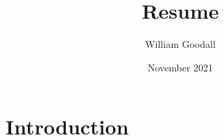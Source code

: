 \documentclass{article}
\title{Resume}
\author{William Goodall}
\date{November 2021}
\begin{document}
\maketitle

\section{Introduction}
\end{document}
